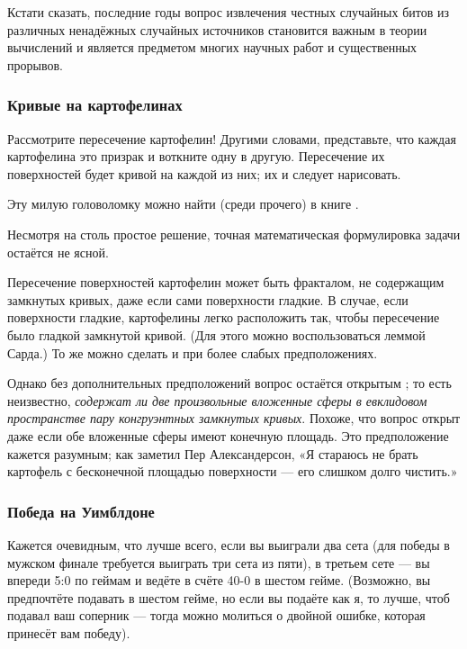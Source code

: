 Кстати сказать, последние годы вопрос извлечения честных %
случайных битов из различных ненадёжных случайных источников становится важным в теории вычислений и является предметом многих научных работ и существенных прорывов.

\subsubsection*{Кривые на картофелинах}

Рассмотрите пересечение картофелин!
Другими словами, представьте, что каждая картофелина это призрак и воткните одну в другую.
Пересечение их поверхностей будет кривой на каждой из них; их и следует нарисовать.

Эту милую головоломку можно найти (среди прочего) в книге \cite{5}.

\begin{addedbytheeditors}
Несмотря на столь простое решение, точная математическая формулировка задачи остаётся не ясной.

Пересечение поверхностей картофелин может быть фракталом, не содержащим замкнутых кривых, даже если сами поверхности гладкие.
В случае, если поверхности гладкие, картофелины легко расположить так, чтобы пересечение было гладкой замкнутой кривой.
(Для этого можно воспользоваться леммой Сарда.)
То же можно сделать и при более слабых предположениях.

Однако без дополнительных предположений вопрос остаётся открытым \cite{agol};
то есть неизвестно, \emph{содержат ли две произвольные вложенные сферы в евклидовом пространстве пару конгруэнтных замкнутых кривых}. 
Похоже, что вопрос открыт даже если обе вложенные сферы имеют конечную площадь.
Это предположение кажется разумным; как заметил Пер Александерсон,
«Я стараюсь не брать картофель с бесконечной площадью поверхности --- его слишком долго чистить.»
\end{addedbytheeditors}

\subsubsection*{Победа на Уимблдоне}

Кажется очевидным, что лучше всего, если вы выиграли два сета (для победы в
мужском финале требуется выиграть три сета из пяти), в третьем сете --- вы впереди 5:0 по
геймам и ведёте в счёте 40-0 в шестом гейме.
(Возможно, вы предпочтёте подавать в шестом гейме, но если вы подаёте как я, то лучше, чтоб подавал ваш соперник --- тогда можно молиться о двойной ошибке, которая принесёт вам победу).


